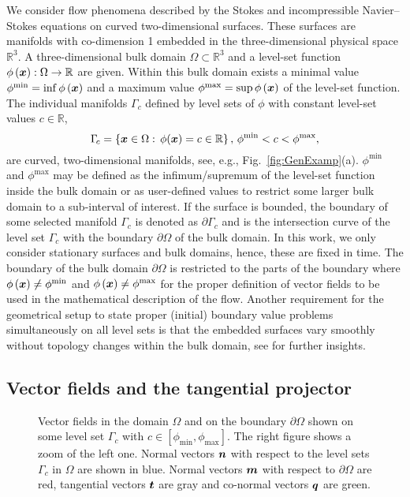 \documentclass[12pt, twoside, english]{article}
\numberwithin{equation}{section}
\newcommand{\vek}[1]{\mathchoice{\displaystyle\boldsymbol#1}
{\textstyle\boldsymbol#1}{\scriptstyle\boldsymbol#1}
{\scriptscriptstyle\boldsymbol#1}}
\begin{document}
We consider flow phenomena described by the Stokes and incompressible Navier--Stokes equations on curved two-dimensional surfaces. These surfaces are manifolds with co-dimension 1 embedded in the three-dimensional physical space $\mathbb{R}^3$. A three-dimensional bulk domain $\Omega \subset \mathbb{R}^3$ and a level-set function $\phi\left(\vek{x}\right):\Omega\rightarrow\mathbb{R}$ are given. Within this bulk domain exists a minimal value $\phi^{\min}=\inf\phi\left(\vek{x}\right)$ and a maximum value $\phi^{\max}=\sup\phi\left(\vek{x}\right)$ of the level-set function. The individual manifolds $\Gamma_{\!c}$ defined by level sets of $\phi$ with constant level-set values $c\in\mathbb{R}$, 
\begin{equation}
	\Gamma_{\!c}=\left\{ \vek{x}\in\Omega:\,\phi(\vek{x})=c\in\mathbb{R}\right\},\,\phi^{\min}<c<\phi^{\max} ,\label{eq:LevelSets}
\end{equation}
are curved, two-dimensional manifolds, see, e.g., Fig.~\ref{fig:GenExamp}(a). $\phi^{\min}$ and $\phi^{\max}$ may be defined as the infimum/supremum of the level-set function inside the bulk domain or as user-defined values to restrict some larger bulk domain to a sub-interval of interest. If the surface is bounded, the boundary of some selected manifold $\Gamma_{\!c}$ is denoted as $\partial \Gamma_{\!c}$ and is the intersection curve of the level set $\Gamma_{\!c}$ with the boundary $\partial \Omega$ of the bulk domain. In this work, we only consider stationary surfaces and bulk domains, hence, these are fixed in time. The boundary of the bulk domain $\partial \Omega$ is restricted to the parts of the boundary where $\phi\left(\vek{x}\right)\neq\phi^{\min}$ and $\phi\left(\vek{x}\right)\neq\phi^{\max}$ for the proper definition of vector fields to be used in the mathematical description of the flow. Another requirement for the geometrical setup to state proper (initial) boundary value problems simultaneously on all level sets is that the embedded surfaces vary smoothly without topology changes within the bulk domain, see \cite{Fries_2023a,Kaiser_2024a} for further insights.

\subsection{Vector fields and the tangential projector}\label{subsec:GeomVecs}

\begin{figure}
	\centering
	
	\subfigure[vectors $\vek{n}$, $\vek{m}$, $\vek{t}$, $\vek{q}$]{\texttt{[image: LSvectors\_1]}}\qquad{}
	
	\caption{\label{fig:VisVectors}Vector fields in the domain $\Omega$ and
		on the boundary $\partial\Omega$ shown on some level set $\Gamma_{\!c}$ with $c \in \left[\phi_{\min}, \phi_{\max}\right]$. The right figure shows a zoom of the left one. Normal vectors $\vek{n}$ with respect to the level sets $\Gamma_{\!c}$ in $\Omega$ are shown in blue. Normal vectors $\vek{m}$ with respect to $\partial\Omega$ are red, tangential vectors $\vek{t}$ are gray and co-normal vectors $\vek{q}$ are green.}
\end{figure}
\end{document}
